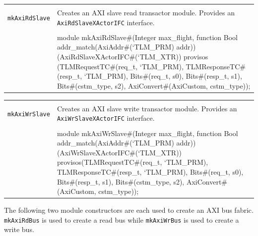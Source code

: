 \documentclass[twoside,letterpaper]{article}
\newcommand{\te}[1]{\texttt{#1}}
\newenvironment{libverbatim}
  {\vspace*{-1.0em}
   \verbatim}
  {\endverbatim
  }
\begin{document}
\begin{center}
\begin{tabular}{|p{1 in}|p{5.2 in}|}
\hline 
&\\
\te{mkAxiRdSlave}&Creates an AXI slave read transactor module. Provides an \te{AxiRdSlaveXActorIFC} interface.  \\
&\\
\cline{2-2}
&\begin{libverbatim}
module mkAxiRdSlave#(Integer max_flight, 
                     function Bool addr_match(AxiAddr#(`TLM_PRM) addr)) 
	            (AxiRdSlaveXActorIFC#(`TLM_XTR))
   provisos (TLMRequestTC#(req_t, `TLM_PRM),
             TLMResponseTC#(resp_t, `TLM_PRM),
             Bits#(req_t, s0),
             Bits#(resp_t, s1),
             Bits#(cstm_type, s2),
             AxiConvert#(AxiCustom, cstm_type));
\end{libverbatim}
\\
\hline
\end{tabular}
\end{center}


\begin{center}
\begin{tabular}{|p{1 in}|p{5.2 in}|}
\hline 
&\\
\te{mkAxiWrSlave}&Creates an AXI slave write transactor module. Provides an \te{AxiWrSlaveXActorIFC} interface.  \\
&\\
\cline{2-2}
&\begin{libverbatim}
module mkAxiWrSlave#(Integer max_flight, 
                     function Bool addr_match(AxiAddr#(`TLM_PRM) addr)) 
		    (AxiWrSlaveXActorIFC#(`TLM_XTR))
   provisos(TLMRequestTC#(req_t, `TLM_PRM),
            TLMResponseTC#(resp_t, `TLM_PRM),
            Bits#(req_t, s0),
            Bits#(resp_t, s1),
            Bits#(cstm_type, s2),
            AxiConvert#(AxiCustom, cstm_type));
\end{libverbatim}
\\
\hline
\end{tabular}
\end{center}

The following two module constructors are each used to create an AXI
bus fabric. \te{mkAxiRdBus} is used to create a read bus while
\te{mkAxiWrBus} is used to create a write bus.


\end{document}
